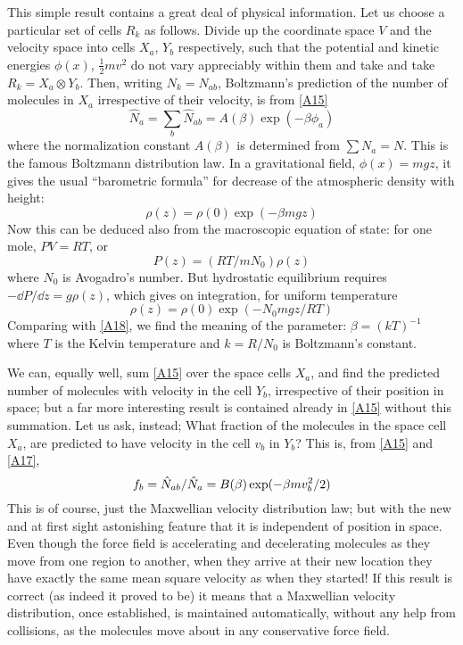 This simple result contains a great deal of physical information.
Let us choose a particular set of cells $R_k$ as follows.
Divide up the coordinate space $V$ and the velocity space into cells $X_a$, $Y_b$ respectively, such that the potential and kinetic energies $\phi(x)$, $\frac{1}{2}mv^2$ do not vary appreciably within them and take and take $R_k = X_a \otimes Y_b$.
Then, writing $N_k= N_{ab}$, Boltzmann's prediction of the number of molecules in $X_a$ irrespective of their velocity, is from \eqref{A15}
\begin{equation}
	\label{A17}
	\hat{N}_a = \sum_{b}\hat{N}_{ab} = A(\beta) \exp(-\beta\phi_a)
\end{equation}
where the normalization constant $A(\beta)$ is determined from $\sum N_a = N$.
This is the famous Boltzmann distribution law.
In
a gravitational field, $\phi(x) = mgz$, it gives the usual ``barometric formula'' for decrease of the atmospheric density with height:
\begin{equation}
	\label{A18}
	\rho(z) = \rho(0) \exp(-\beta mgz)
\end{equation}
Now this can be deduced also from the macroscopic equation of state: for one mole, $PV=RT$, or
\begin{equation*}
	P(z) = (RT/mN_0)\rho(z)
\end{equation*}
where $N_0$ is Avogadro's number.
But hydrostatic equilibrium requires $-\dd P/\dd z = g\rho(z)$, which gives on integration, for uniform temperature
\begin{equation*}
	\rho(z) = \rho(0) \exp(-N_0 mgz/RT)
\end{equation*}
Comparing with \eqref{A18}, we find the meaning of the parameter: $\beta = (kT)^{-1}$ where $T$ is the Kelvin temperature and $k = R/N_0$ is Boltzmann's constant.

We can, equally well, sum \eqref{A15} over the space cells $X_a$, and find the predicted number of molecules with velocity in the cell $Y_b$, irrespective of their position in space; but a far more interesting result is contained already in \eqref{A15} without this summation.
Let us ask, instead; What fraction of the molecules in the space cell $X_a$, are predicted to have velocity in the cell $v_b$ in $Y_b$? This is, from \eqref{A15} and \eqref{A17},
\begin{equation}
	\refstepcounter{equation} %
	\label{A20}
	f_b = \hat{N}_{ab}/\hat{N}_a = B(\beta) \exp (-\beta mv^2_b/2)
\end{equation}
This is  of course, just the Maxwellian velocity distribution law; but with the new and at first sight astonishing feature that it is independent of position in space.
Even though the force field is accelerating and decelerating molecules as they move from one region to another, when they arrive at their new location they have exactly the same mean square velocity as when they started!
If this result is correct (as indeed it proved to be) it means that a Maxwellian velocity distribution, once established, is maintained automatically, without any help from collisions, as the molecules move about in any conservative force field.

